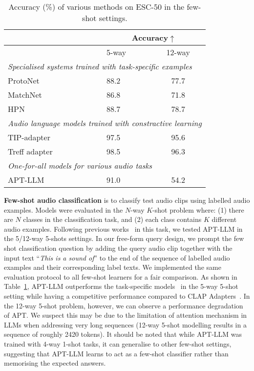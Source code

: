 \begin{table}[h]
\centering
\caption{Accuracy (\%) of various methods on ESC-50 in the few-shot settings.}
\label{tab.:few_shot}
\begin{tabular}{llc}
\toprule
                                          & \multicolumn{2}{c}{Accuracy$\uparrow$} \\ \hline
                                          & 5-way          & 12-way         \\ \cline{2-3}
\multicolumn{3}{l}{\textit{Specialised systems trained with task-specific examples}} \\
ProtoNet~\citep{snell_prototypical_2017}   & 88.2          & 77.7          \\
MatchNet~\citep{vinyals_matching_2016}     & 86.8          & 71.8          \\
HPN~\citep{liang_leveraging_2022}          & 88.7          & 78.7          \\ \midrule
\multicolumn{3}{l}{\textit{Audio language models trained with constractive learning}} \\
TIP-adapter~\citep{zhang_tip-adapter_2022} & 97.5          & 95.6          \\
Treff adapter~\citep{liang_adapting_2023}  & 98.5          & 96.3          \\ \midrule
\multicolumn{3}{l}{\textit{One-for-all models for various audio tasks}} \\
\rowcolor{lightgray!60}
APT-LLM                                & 91.0          & 54.2          \\ \bottomrule
\end{tabular}
\end{table}

\textbf{Few-shot audio classification} is to classify test audio clips using labelled audio examples. Models were evaluated in the $N$-way $K$-shot problem where: (1) there are $N$ classes in the classification task, and (2) each class contains $K$ different audio examples. Following previous works~\citep{liang_adapting_2023} in this task, we tested APT-LLM in the 5/12-way 5-shots settings. In our free-form query design, we prompt the few shot classification question by adding the query audio clip together with the input text ``\textit{This is a sound of}'' to the end of the sequence of labelled audio examples and their corresponding label texts. We implemented the same evaluation protocol to all few-shot learners for a fair comparison. As shown in Table~\ref{tab.:few_shot}, APT-LLM outperforms the task-specific models~\citep{snell_prototypical_2017,vinyals_matching_2016,liang_leveraging_2022} in the 5-way 5-shot setting while having a competitive performance compared to CLAP Adapters~\citep{zhang_tip-adapter_2022,liang_adapting_2023}. In the 12-way 5-shot problem, however, we can observe a performance degradation of APT. We suspect this may be due to the limitation of attention mechanism in LLMs when addressing very long sequences (12-way 5-shot modelling results in a sequence of roughly 2420 tokens). It should be noted that while APT-LLM was trained with 4-way 1-shot tasks, it can generalise to other few-shot settings, suggesting that APT-LLM learns to act as a few-shot classifier rather than memorising the expected answers.

